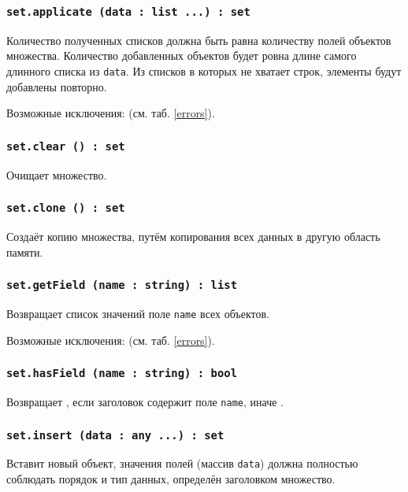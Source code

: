 \subsubsection{\texttt{set.applicate (data : list ...) : set}}

Количество полученных списков должна быть равна количеству полей объектов множества. Количество добавленных объектов будет ровна длине самого длинного списка из \texttt{data}. Из списков в которых не хватает строк, элементы будут добавлены повторно.

Возможные исключения:  (см. таб. \ref{errors}).

\subsubsection{\texttt{set.clear () : set}}

Очищает множество.

\subsubsection{\texttt{set.clone () : set}}

Создаёт копию множества, путём копирования всех данных в другую область памяти.

\subsubsection{\texttt{set.getField (name : string) : list}}

Возвращает список значений поле \texttt{name} всех объектов.

Возможные исключения:  (см. таб. \ref{errors}).

\subsubsection{\texttt{set.hasField (name : string) : bool}}

Возвращает \true, если заголовок содержит поле \texttt{name}, иначе \false.

\subsubsection{\texttt{set.insert (data : any ...) : set}}

Вставит новый объект, значения полей (массив \texttt{data}) должна полностью соблюдать порядок и тип данных, определён заголовком множество.

